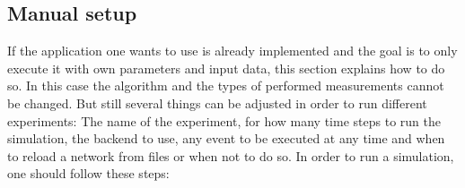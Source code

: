 \documentclass[11pt,fleqn]{book} %
\newcommand{\backend}[1][]{backend#1}
\begin{document}
\subsection{Manual setup}\label{sec:Simulation_Measurements}
If the application one wants to use is already implemented and the goal is to only execute it with own parameters and input data, this section explains how to do so. In this case the algorithm and the types of performed measurements cannot be changed. But still several things can be adjusted in order to run different experiments: The name of the experiment, for how many time steps to run the simulation, the \backend{} to use, any event to be executed at any time and when to reload a network from files or when not to do so. In order to run a simulation, one should follow these steps: 
\end{document}
